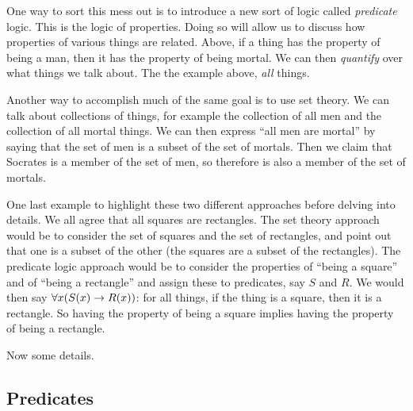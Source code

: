 \documentclass[12pt]{article}
\begin{document}
One way to sort this mess out is to introduce a new sort of logic called {\em predicate} logic.  This is the logic of properties.  Doing so will allow us to discuss how properties of various things are related.  Above, if a thing has the property of being a man, then it has the property of being mortal.  We can then {\em quantify} over what things we talk about.  The the example above, {\em all} things.  

Another way to accomplish much of the same goal is to use set theory. We can talk about collections of things, for example the collection of all men and the collection of all mortal things.  We can then express ``all men are mortal'' by saying that the set of men is a subset of the set of mortals.  Then we claim that Socrates is a member of the set of men, so therefore is also a member of the set of mortals.

One last example to highlight these two different approaches before delving into details.  We all agree that all squares are rectangles.  The set theory approach would be to consider the set of squares and the set of rectangles, and point out that one is a subset of the other (the squares are a subset of the rectangles).  The predicate logic approach would be to consider the properties of ``being a square'' and of ``being a rectangle'' and assign these to predicates, say $S$ and $R$.  We would then say $\forall x (S(x) \rightarrow R(x))$: for all things, if the thing is a square, then it is a rectangle.  So having the property of being a square implies having the property of being a rectangle.

Now some details.



%
%
%
%

\subsection{Predicates}
\end{document}
